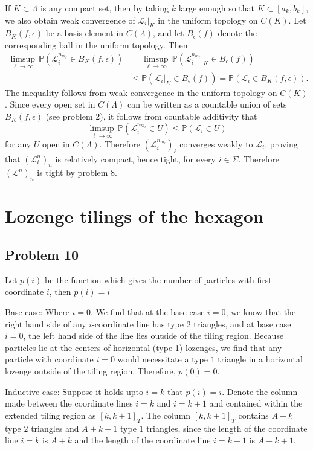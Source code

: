 \documentclass[12pt]{article}
\begin{document}
		If $K\subset\Lambda$ is any compact set, then by taking $k$ large enough so that $K\subset [a_k,b_k]$, we also obtain weak convergence of $\mathcal{L}_i|_K$ in the uniform topology on $C(K)$. Let $B_K(f,\epsilon)$ be a basis element in $C(\Lambda)$, and let $B_\epsilon(f)$ denote the corresponding ball in the uniform topology. Then
		\begin{align*}
		\limsup_{\ell\to\infty}\,\mathbb{P}(\mathcal{L}^{n_{m_\ell}}_i \in B_K(f,\epsilon)) &= \limsup_{\ell\to\infty}\,\mathbb{P}(\mathcal{L}^{n_{m_\ell}}_i|_K \in B_\epsilon(f))\\
		& \leq \mathbb{P}(\mathcal{L}_i|_K \in B_\epsilon(f)) = \mathbb{P}(\mathcal{L}_i \in B_K(f,\epsilon)).
		\end{align*}
		The inequality follows from weak convergence in the uniform topology on $C(K)$. Since every open set in $C(\Lambda)$ can be written as a countable union of sets $B_K(f,\epsilon)$ (see problem 2), it follows from countable additivity that
		\[
		\limsup_{\ell\to\infty}\,\mathbb{P}(\mathcal{L}^{n_{m_\ell}}_i \in U) \leq \mathbb{P}(\mathcal{L}_i \in U)
		\]
		for any $U$ open in $C(\Lambda)$. Therefore $(\mathcal{L}_i^{n_{m_\ell}})_\ell$ converges weakly to $\mathcal{L}_i$, proving that $(\mathcal{L}^n_i)_n$ is relatively compact, hence tight, for every $i\in\Sigma$. Therefore $(\mathcal{L}^n)_n$ is tight by problem 8.


\section{Lozenge tilings of the hexagon}

	\subsection*{Problem 10}
		Let $p(i)$ be the function which gives the number of particles with first coordinate $i$, then $p(i)=i$
		
		Base case: Where $i=0$. We find that at the base case $i=0$, we know that the right hand side of any $i$-coordinate line has type $2$ triangles, and at base case $i=0$,  the left hand side of the line lies outside of the tiling region. Because particles lie at the centers of horizontal (type 1) lozenges, we find that any particle with coordinate $i=0$ would necessitate a type $1$ triangle in a horizontal lozenge outside of the tiling region. Therefore, $p(0)=0$.
		
		Inductive case: Suppose it holds upto $i=k$ that $p(i)=i$. Denote the column made between the coordinate lines $i=k$ and $i=k+1$ and contained within the extended tiling region as $[k,k+1]_T$. The column $[k, k+1]_T$ contains $A+k$ type $2$ triangles and $A+k+1$ type $1$ triangles, since the length of the coordinate line $i=k$ is $A+k$ and the length of the coordinate line $i=k+1$ is $A+k+1$. 
		
\end{document}
